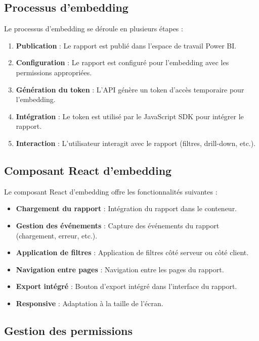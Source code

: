 \subsection{Processus d'embedding}

Le processus d'embedding se déroule en plusieurs étapes :

\begin{enumerate}
    \item \textbf{Publication} : Le rapport est publié dans l'espace de travail Power BI.
    \item \textbf{Configuration} : Le rapport est configuré pour l'embedding avec les permissions appropriées.
    \item \textbf{Génération du token} : L'API génère un token d'accès temporaire pour l'embedding.
    \item \textbf{Intégration} : Le token est utilisé par le JavaScript SDK pour intégrer le rapport.
    \item \textbf{Interaction} : L'utilisateur interagit avec le rapport (filtres, drill-down, etc.).
\end{enumerate}

\subsection{Composant React d'embedding}

Le composant React d'embedding offre les fonctionnalités suivantes :

\begin{itemize}
    \item \textbf{Chargement du rapport} : Intégration du rapport dans le conteneur.
    \item \textbf{Gestion des événements} : Capture des événements du rapport (chargement, erreur, etc.).
    \item \textbf{Application de filtres} : Application de filtres côté serveur ou côté client.
    \item \textbf{Navigation entre pages} : Navigation entre les pages du rapport.
    \item \textbf{Export intégré} : Bouton d'export intégré dans l'interface du rapport.
    \item \textbf{Responsive} : Adaptation à la taille de l'écran.
\end{itemize}

\subsection{Gestion des permissions}

